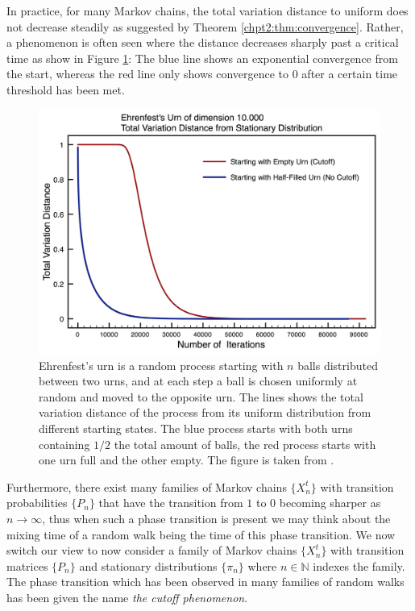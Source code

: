\documentclass[11pt]{report}
\begin{document}
In practice, for many Markov chains, the total variation distance to uniform does not decrease steadily as suggested by Theorem \ref{chpt2:thm:convergence}. Rather, a phenomenon is often seen where the distance decreases sharply past a critical time as show in Figure \ref{chpt2:fig:cutoff}: The blue line shows an exponential convergence from the start, whereas the red line only shows convergence to $0$ after a certain time threshold has been met.








\begin{figure}[H]
	\includegraphics[scale=0.17]{Cutoff.jpg}
	\caption[Total variation distance of Ehrenfest's urn from two different starting distributions]{Ehrenfest's urn is a random process starting with $n$ balls distributed between two urns, and at each step  a ball is chosen uniformly at random and moved to the opposite urn. The lines shows the total variation distance of the process from its uniform distribution from different starting states. The blue process starts with both urns containing $1/2$ the total amount of balls, the red process starts with one urn full and the other empty. The figure is taken from \cite{cutoffPresentation}.}
	\label{chpt2:fig:cutoff}
\end{figure}



Furthermore, there exist many families of Markov 
chains $\{X_{n}^{t}\}$ with transition probabilities $\{P_{n}\}$ that have the 
transition from $1$ to $0 $ becoming sharper as $n\to\infty$, 
thus when such a phase transition is 
present we may think about 
the mixing time of a random walk being the time of this phase transition.
We now switch our view to now 
consider a family of Markov chains $\{X^{t}_{n}\}$ with transition matrices 
$\{P_{n}\}$ and stationary distributions $\{\pi_{n}\}$ where $n \in \mathbb{N}$ 
indexes the family. The phase transition which has been observed in many 
families of random walks has been given the name \emph{the cutoff phenomenon}. 
\end{document}
